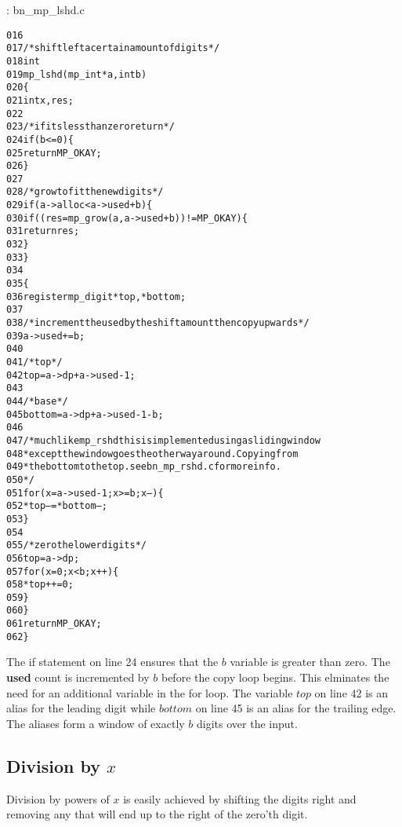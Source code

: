 \documentclass[b5paper]{book}
\begin{document}
\vspace{+3mm}\begin{small}
\hspace{-5.1mm}{\bf File}: bn\_mp\_lshd.c
\vspace{-3mm}
\begin{alltt}
016   
017   /* shift left a certain amount of digits */
018   int
019   mp_lshd (mp_int * a, int b)
020   \{
021     int     x, res;
022   
023     /* if its less than zero return */
024     if (b <= 0) \{
025       return MP_OKAY;
026     \}
027   
028     /* grow to fit the new digits */
029     if (a->alloc < a->used + b) \{
030        if ((res = mp_grow (a, a->used + b)) != MP_OKAY) \{
031          return res;
032        \}
033     \}
034   
035     \{
036       register mp_digit *top, *bottom;
037   
038       /* increment the used by the shift amount then copy upwards */
039       a->used += b;
040   
041       /* top */
042       top = a->dp + a->used - 1;
043   
044       /* base */
045       bottom = a->dp + a->used - 1 - b;
046   
047       /* much like mp_rshd this is implemented using a sliding window
048        * except the window goes the otherway around.  Copying from
049        * the bottom to the top.  see bn_mp_rshd.c for more info.
050        */
051       for (x = a->used - 1; x >= b; x--) \{
052         *top-- = *bottom--;
053       \}
054   
055       /* zero the lower digits */
056       top = a->dp;
057       for (x = 0; x < b; x++) \{
058         *top++ = 0;
059       \}
060     \}
061     return MP_OKAY;
062   \}
\end{alltt}
\end{small}

The if statement on line 24 ensures that the $b$ variable is greater than zero.  The \textbf{used} count is incremented by $b$ before
the copy loop begins.  This elminates the need for an additional variable in the for loop.  The variable $top$ on line 42 is an alias
for the leading digit while $bottom$ on line 45 is an alias for the trailing edge.  The aliases form a window of exactly $b$ digits
over the input.  

\subsection{Division by $x$}

Division by powers of $x$ is easily achieved by shifting the digits right and removing any that will end up to the right of the zero'th digit.  
\end{document}
